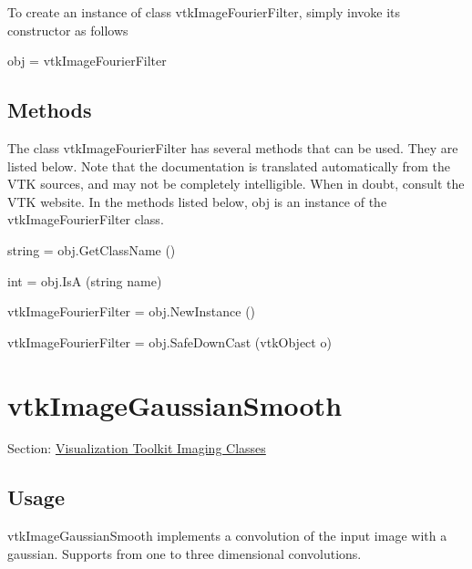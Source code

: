 To create an instance of class vtk\-Image\-Fourier\-Filter, simply invoke its constructor as follows \begin{DoxyVerb}  obj = vtkImageFourierFilter
\end{DoxyVerb}
 \hypertarget{vtkwidgets_vtkxyplotwidget_Methods}{}\subsection{Methods}\label{vtkwidgets_vtkxyplotwidget_Methods}
The class vtk\-Image\-Fourier\-Filter has several methods that can be used. They are listed below. Note that the documentation is translated automatically from the V\-T\-K sources, and may not be completely intelligible. When in doubt, consult the V\-T\-K website. In the methods listed below, {\ttfamily obj} is an instance of the vtk\-Image\-Fourier\-Filter class. 
\begin{DoxyItemize}
\item {\ttfamily string = obj.\-Get\-Class\-Name ()}  
\item {\ttfamily int = obj.\-Is\-A (string name)}  
\item {\ttfamily vtk\-Image\-Fourier\-Filter = obj.\-New\-Instance ()}  
\item {\ttfamily vtk\-Image\-Fourier\-Filter = obj.\-Safe\-Down\-Cast (vtk\-Object o)}  
\end{DoxyItemize}\hypertarget{vtkimaging_vtkimagegaussiansmooth}{}\section{vtk\-Image\-Gaussian\-Smooth}\label{vtkimaging_vtkimagegaussiansmooth}
Section\-: \hyperlink{sec_vtkimaging}{Visualization Toolkit Imaging Classes} \hypertarget{vtkwidgets_vtkxyplotwidget_Usage}{}\subsection{Usage}\label{vtkwidgets_vtkxyplotwidget_Usage}
vtk\-Image\-Gaussian\-Smooth implements a convolution of the input image with a gaussian. Supports from one to three dimensional convolutions.

